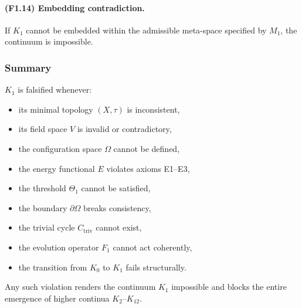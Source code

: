 \paragraph{(F1.14) Embedding contradiction.}
If $K_1$ cannot be embedded within the admissible meta-space specified by
$M_1$, the continuum is impossible.



\subsubsection{Summary}

$K_1$ is falsified whenever:

\begin{itemize}
    \item its minimal topology $(X,\tau)$ is inconsistent,
    \item its field space $V$ is invalid or contradictory,
    \item the configuration space $\Omega$ cannot be defined,
    \item the energy functional $E$ violates axioms E1–E3,
    \item the threshold $\Theta_1$ cannot be satisfied,
    \item the boundary $\partial\Omega$ breaks consistency,
    \item the trivial cycle $C_{\mathrm{triv}}$ cannot exist,
    \item the evolution operator $F_1$ cannot act coherently,
    \item the transition from $K_0$ to $K_1$ fails structurally.
\end{itemize}

Any such violation renders the continuum $K_1$ impossible and blocks the
entire emergence of higher continua $K_2$–$K_{12}$.
